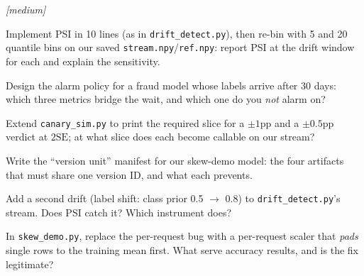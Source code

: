 \emph{[medium]}
\begin{exercise}
Implement PSI in 10 lines (as in \texttt{drift\_detect.py}), then
re-bin with 5 and 20 quantile bins on our saved
\texttt{stream.npy}/\texttt{ref.npy}: report PSI at the drift window
for each and explain the sensitivity.
\end{exercise}
\begin{exercise}
Design the alarm policy for a fraud model whose labels arrive after
30 days: which three metrics bridge the wait, and which one do you
\emph{not} alarm on?
\end{exercise}
\begin{exercise}
Extend \texttt{canary\_sim.py} to print the required slice for a
$\pm1$pp and a $\pm0.5$pp verdict at $2\mathrm{SE}$; at what slice
does each become callable on our stream?
\end{exercise}
\begin{exercise}
Write the ``version unit'' manifest for our skew-demo model: the four
artifacts that must share one version ID, and what each prevents.
\end{exercise}
\begin{exercise}
Add a second drift (label shift: class prior 0.5 $\to$ 0.8) to
\texttt{drift\_detect.py}'s stream. Does PSI catch it? Which
instrument does?
\end{exercise}
\begin{exercise}
In \texttt{skew\_demo.py}, replace the per-request bug with a
per-request scaler that \emph{pads} single rows to the training mean
first. What serve accuracy results, and is the fix legitimate?
\end{exercise}

